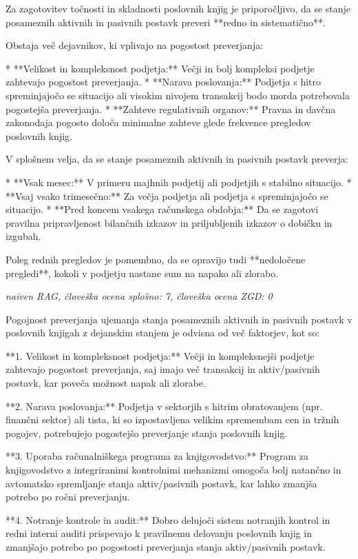 \documentclass[a4paper,12pt,openright]{book}
\begin{document}
Za zagotovitev točnosti in skladnosti poslovnih knjig je priporočljivo, da se stanje posameznih aktivnih in pasivnih postavk preveri **redno in sistematično**.

Obstaja več dejavnikov, ki vplivajo na pogostost preverjanja:

* **Velikost in kompleksnost podjetja:** Večji in bolj kompleksi podjetje zahtevajo pogostost preverjanja.
* **Narava poslovanja:** Podjetja s hitro spreminjajočo se situacijo ali visokim nivojem transakcij bodo morda potrebovala pogostejša preverjanja.
* **Zahteve regulativnih organov:** Pravna in davčna zakonodaja pogosto določa minimalne zahteve glede frekvence pregledov poslovnih knjig.

V splošnem velja, da se stanje posameznih aktivnih in pasivnih postavk preverja:

* **Vsak mesec:** V primeru majhnih podjetij ali podjetjih s stabilno situacijo.
* **Vsaj vsako trimesečno:** Za večja podjetja ali podjetja s spreminjajočo se situacijo.
* **Pred koncem vsakega računskega obdobja:** Da se zagotovi pravilna pripravljenost bilančnih izkazov in priljubljenih izkazov o dobičku in izgubah.


Poleg rednih pregledov je pomembno, da se opravijo tudi **nedoločene pregledi**, kokoli v podjetju nastane sum na napako ali zlorabo.

\vspace{0.5cm}
\textit{naiven RAG, človeška ocena splošno: 7, človeška ocena ZGD: 0}

Pogojnost preverjanja ujemanja stanja posameznih aktivnih in pasivnih postavk v poslovnih knjigah z dejanskim stanjem je odvisna od več faktorjev, kot so:

**1. Velikost in kompleksnost podjetja:** Večji in kompleksnejši podjetje zahtevajo pogostost preverjanja, saj imajo več transakcij in aktiv/pasivnih postavk, kar poveča možnost napak ali zlorabe.

**2. Narava poslovanja:** Podjetja v sektorjih s hitrim obratovanjem (npr. finančni sektor) ali tista, ki so izpostavljena velikim spremembam cen in tržnih pogojev, potrebujejo pogostejšo preverjanje stanja poslovnih knjig.

**3. Uporaba računalniškega programa za knjigovodstvo:** Program za knjigovodstvo z integriranimi kontrolnimi mehanizmi omogoča bolj natančno in avtomatsko spremljanje stanja aktiv/pasivnih postavk, kar lahko zmanjša potrebo po ročni preverjanju.

**4. Notranje kontrole in audit:** Dobro delujoči sistem notranjih kontrol in redni interni auditi prispevajo k pravilnemu delovanju poslovnih knjig in zmanjšajo potrebo po pogostosti preverjanja stanja aktiv/pasivnih postavk.
\end{document}
